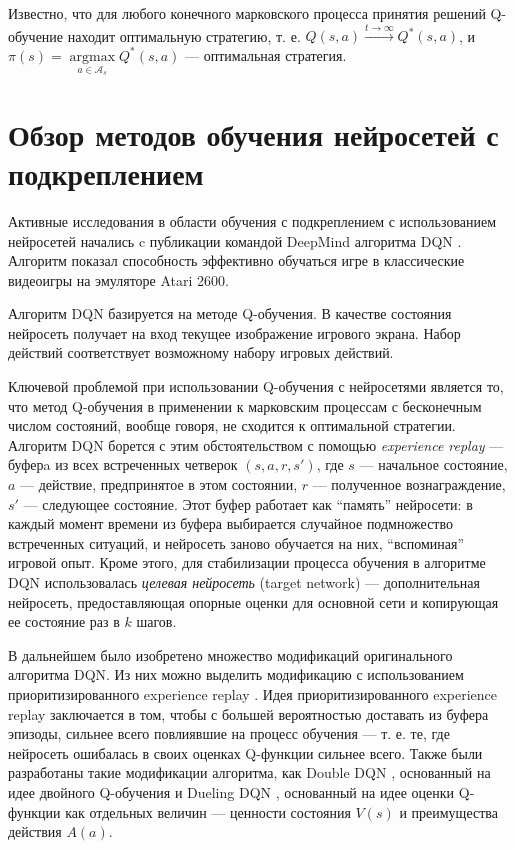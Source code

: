 \documentclass[specification,annotation,times]{itmo-student-thesis}
\DeclareMathOperator{\argmax}{argmax}
\theoremstyle{definition}
\begin{document}
Известно, что для любого конечного марковского процесса принятия решений
Q-обучение находит оптимальную стратегию, т. е. $Q(s, a) \xrightarrow{t
  \rightarrow \infty} Q^*(s, a)$, и $\pi(s) = \argmax\limits_{a \in
  \mathcal{A}_s} {Q^*(s, a)}$ --- оптимальная стратегия.

\section{Обзор методов обучения нейросетей с подкреплением}\label{overview:nns}

Активные исследования в области обучения с подкреплением с использованием
нейросетей начались c публикации командой DeepMind алгоритма
DQN \cite{deepmind-dqn-orig}. Алгоритм показал способность эффективно обучаться
игре в классические видеоигры на эмуляторе Atari 2600. 

Алгоритм DQN базируется на методе Q-обучения. В качестве состояния нейросеть
получает на вход текущее изображение игрового экрана. Набор действий
соответствует возможному набору игровых действий.

Ключевой проблемой при использовании Q-обучения с нейросетями является то, что
метод Q-обучения в применении к марковским процессам с бесконечным числом
состояний, вообще говоря, не сходится к оптимальной стратегии. Алгоритм DQN
борется с этим обстоятельством с помощью \textit{experience replay} --- буферa
из всех встреченных четверок $(s, a, r, s')$, где $s$ ---
начальное состояние, $a$ --- действие, предпринятое в этом состоянии, $r$ ---
полученное вознаграждение, $s'$ --- следующее состояние. Этот буфер работает как
\enquote{память} нейросети: в каждый момент времени из буфера выбирается случайное
подмножество встреченных ситуаций, и нейросеть заново обучается на них,
\enquote{вспоминая} игровой опыт. Кроме этого, для стабилизации процесса обучения в
алгоритме DQN использовалась \textit{целевая нейросеть} (target network) ---
дополнительная нейросеть, предоставляющая опорные оценки для основной сети и
копирующая ее состояние раз в $k$ шагов.

В дальнейшем было изобретено множество модификаций оригинального алгоритма DQN.
Из них можно выделить модификацию с использованием приоритизированного
experience replay \cite{schaul2015prioritized}. Идея приоритизированного
experience replay заключается в том, чтобы с большей вероятностью доставать из
буфера эпизоды, сильнее всего повлиявшие на процесс обучения --- т. е. те,
где нейросеть ошибалась в своих оценках Q-функции сильнее всего.
Также были разработаны такие модификации алгоритма, как Double
DQN \cite{van2016deep}, основанный на идее двойного
Q-обучения \cite{hasselt2010double} и Dueling DQN \cite{wang2015dueling},
основанный на идее оценки Q-функции как отдельных величин --- ценности состояния
$V(s)$ и преимущества действия $A(a)$.
\end{document}

